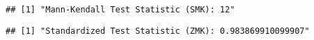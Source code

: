 \documentclass[
]{article}
\newenvironment{Shaded}{\begin{snugshade}}{\end{snugshade}}
\newcommand{\FunctionTok}[1]{\textcolor[rgb]{0.13,0.29,0.53}{\textbf{#1}}}
\newcommand{\NormalTok}[1]{#1}
\newcommand{\SpecialCharTok}[1]{\textcolor[rgb]{0.81,0.36,0.00}{\textbf{#1}}}
\newcommand{\StringTok}[1]{\textcolor[rgb]{0.31,0.60,0.02}{#1}}
\begin{document}
\begin{verbatim}
## [1] "Mann-Kendall Test Statistic (SMK): 12"
\end{verbatim}

\begin{Shaded}
\end{Shaded}

\begin{verbatim}
## [1] "Standardized Test Statistic (ZMK): 0.983869910099907"
\end{verbatim}
\end{document}
